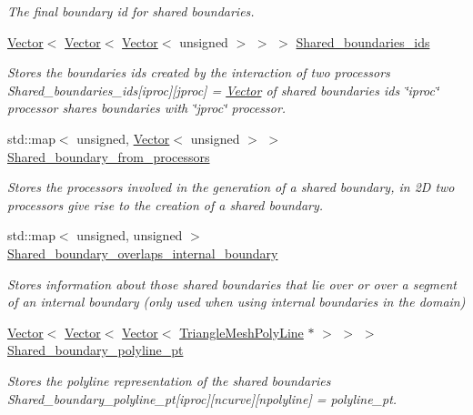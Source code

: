 \begin{DoxyCompactItemize}
\begin{DoxyCompactList}\small\item\em The final boundary id for shared boundaries. \end{DoxyCompactList}\item 
\hyperlink{classoomph_1_1Vector}{Vector}$<$ \hyperlink{classoomph_1_1Vector}{Vector}$<$ \hyperlink{classoomph_1_1Vector}{Vector}$<$ unsigned $>$ $>$ $>$ \hyperlink{classoomph_1_1TriangleMesh_a0a9ca3fff7a20de44410bb246becf0dc}{Shared\+\_\+boundaries\+\_\+ids}
\begin{DoxyCompactList}\small\item\em Stores the boundaries ids created by the interaction of two processors Shared\+\_\+boundaries\+\_\+ids\mbox{[}iproc\mbox{]}\mbox{[}jproc\mbox{]} = \hyperlink{classoomph_1_1Vector}{Vector} of shared boundaries ids \char`\"{}iproc\char`\"{} processor shares boundaries with \char`\"{}jproc\char`\"{} processor. \end{DoxyCompactList}\item 
std\+::map$<$ unsigned, \hyperlink{classoomph_1_1Vector}{Vector}$<$ unsigned $>$ $>$ \hyperlink{classoomph_1_1TriangleMesh_a48491979123f1e1ca1d669c52e255dc1}{Shared\+\_\+boundary\+\_\+from\+\_\+processors}
\begin{DoxyCompactList}\small\item\em Stores the processors involved in the generation of a shared boundary, in 2D two processors give rise to the creation of a shared boundary. \end{DoxyCompactList}\item 
std\+::map$<$ unsigned, unsigned $>$ \hyperlink{classoomph_1_1TriangleMesh_a1ac1fe24d9985f3e778b1362f00d2949}{Shared\+\_\+boundary\+\_\+overlaps\+\_\+internal\+\_\+boundary}
\begin{DoxyCompactList}\small\item\em Stores information about those shared boundaries that lie over or over a segment of an internal boundary (only used when using internal boundaries in the domain) \end{DoxyCompactList}\item 
\hyperlink{classoomph_1_1Vector}{Vector}$<$ \hyperlink{classoomph_1_1Vector}{Vector}$<$ \hyperlink{classoomph_1_1Vector}{Vector}$<$ \hyperlink{classoomph_1_1TriangleMeshPolyLine}{Triangle\+Mesh\+Poly\+Line} $\ast$ $>$ $>$ $>$ \hyperlink{classoomph_1_1TriangleMesh_a88ca952f5e86d5cf5215811600ce6f0b}{Shared\+\_\+boundary\+\_\+polyline\+\_\+pt}
\begin{DoxyCompactList}\small\item\em Stores the polyline representation of the shared boundaries Shared\+\_\+boundary\+\_\+polyline\+\_\+pt\mbox{[}iproc\mbox{]}\mbox{[}ncurve\mbox{]}\mbox{[}npolyline\mbox{]} = polyline\+\_\+pt. \end{DoxyCompactList}\item 

\end{DoxyCompactItemize}
